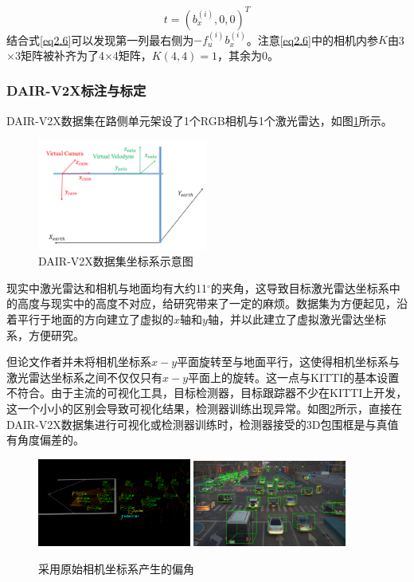 \begin{equation}
    t=(b_x^{(i)},0,0)^T
\end{equation}
结合式\eqref{eq2.6}可以发现第一列最右侧为$-f_{u}^{(i)} b_{x}^{(i)}$。注意\eqref{eq2.6}中的相机内参$K$由3$\times$3矩阵被补齐为了4$\times$4矩阵，$K(4,4)=1$，其余为0。

\subsubsection{DAIR-V2X标注与标定}

DAIR-V2X数据集在路侧单元架设了1个RGB相机与1个激光雷达，如图\ref{fig6}所示。

\begin{figure}[htb] 
    \center
    \includegraphics[width=0.5\textwidth]{figure/fig6.png}
    \caption{DAIR-V2X数据集坐标系示意图}
    \label{fig6}
\end{figure}

现实中激光雷达和相机与地面均有大约11$^\circ$的夹角，这导致目标激光雷达坐标系中的高度与现实中的高度不对应，给研究带来了一定的麻烦。数据集为方便起见，沿着平行于地面的方向建立了虚拟的$x$轴和$y$轴，并以此建立了虚拟激光雷达坐标系，方便研究。

但论文作者并未将相机坐标系$x-y$平面旋转至与地面平行，这使得相机坐标系与激光雷达坐标系之间不仅仅只有$x-y$平面上的旋转。这一点与KITTI的基本设置不符合。由于主流的可视化工具，目标检测器，目标跟踪器不少在KITTI上开发，这一个小小的区别会导致可视化结果，检测器训练出现异常。如图\ref{fig7}所示，直接在DAIR-V2X数据集进行可视化或检测器训练时，检测器接受的3D包围框是与真值有角度偏差的。

\begin{figure}[htb] 
    \center
    \includegraphics[width=0.45\textwidth]{figure/fig10.png}
    \includegraphics[width=0.45\textwidth]{figure/fig11.png}
    \caption{采用原始相机坐标系产生的偏角}
    \label{fig7}
\end{figure}

